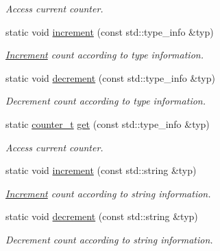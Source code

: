 \begin{DoxyCompactItemize}
\begin{DoxyCompactList}\small\item\em Access current counter. \item\end{DoxyCompactList}\item 
static void \hyperlink{struct_d_d4hep_1_1_instance_count_a615e3109fee2bdd67d047d4decca1c0f}{increment} (const std::type\_\-info \&typ)
\begin{DoxyCompactList}\small\item\em \hyperlink{struct_d_d4hep_1_1_increment}{Increment} count according to type information. \item\end{DoxyCompactList}\item 
static void \hyperlink{struct_d_d4hep_1_1_instance_count_a99ffc259c76fc693c83e8cc493ace1f6}{decrement} (const std::type\_\-info \&typ)
\begin{DoxyCompactList}\small\item\em Decrement count according to type information. \item\end{DoxyCompactList}\item 
static \hyperlink{struct_d_d4hep_1_1_instance_count_ae81dc0c76b135425e14b6dc38262a727}{counter\_\-t} \hyperlink{struct_d_d4hep_1_1_instance_count_a1b6de9faa3cda69498c13c07ea0f289c}{get} (const std::type\_\-info \&typ)
\begin{DoxyCompactList}\small\item\em Access current counter. \item\end{DoxyCompactList}\item 
static void \hyperlink{struct_d_d4hep_1_1_instance_count_a2a6c1324b3462dcd26a7916d6b1ece46}{increment} (const std::string \&typ)
\begin{DoxyCompactList}\small\item\em \hyperlink{struct_d_d4hep_1_1_increment}{Increment} count according to string information. \item\end{DoxyCompactList}\item 
static void \hyperlink{struct_d_d4hep_1_1_instance_count_a5c0cdd835f58abbd7f1d54069b5f04b2}{decrement} (const std::string \&typ)
\begin{DoxyCompactList}\small\item\em Decrement count according to string information. \item\end{DoxyCompactList}\item 

\end{DoxyCompactItemize}
